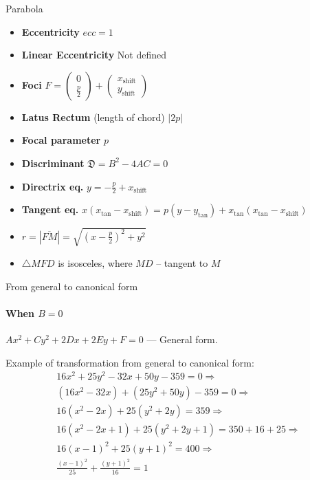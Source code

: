 \documentclass[aspectratio=169]{beamer}
\newcommand{\shf}{\text{shift}}
\begin{document}
\begin{frame}[t]{Parabola}
\begin{multicols}{3}
\begin{itemize}
        \item \textbf{Eccentricity} $ecc = 1$
        \item \textbf{Linear Eccentricity} Not defined
        \item \textbf{Foci} $F = \begin{pmatrix} 0\\\frac{p}{2} \end{pmatrix} + \begin{pmatrix} x_{\shf}\\y_{\shf} \end{pmatrix}$
        \item \textbf{Latus Rectum} (length of chord) $|2p|$
        \item \textbf{Focal parameter}  $p$
        \item \textbf{Discriminant} $\mathfrak{D} = B^2 - 4AC = 0$
        \item \textbf{Directrix eq.} $y = -\frac{p}{2} + x_{\shf}$
        \item \textbf{Tangent eq.}  $x(x_{\text{tan}}-x_{\shf})=p(y-y_{\text{tan}})+x_{\text{tan}}(x_{\text{tan}}-x_{\shf})$
        \item $r = |\overline{FM}|=\sqrt{(x-\frac{p}{2})^2+y^2}$
        \item $\triangle MFD$ is isosceles, where $MD$ -- tangent to $M$
        \end{itemize}
\end{multicols}
\end{frame}

\begin{frame}[t]{From general to canonical form}
\framesubtitle{When $B=0$}
    $Ax^2 +Cy^2 +2Dx + 2Ey +F = 0$ --- General form. \medskip

    Example of transformation from general to canonical form:
    \begin{align*}
        16x^2 + 25y^2 - 32x + 50y -359 = 0 \Rightarrow \\
        (16x^2 - 32x) + (25y^2 +50y) -359 = 0 \Rightarrow \\ 
        16(x^2 - 2x) + 25(y^2 + 2y) = 359 \Rightarrow \\ 
        16(x^2 -2x +1) + 25(y^2 +2y +1) = 350 + 16 + 25 \Rightarrow \\
        16(x-1)^2 +25(y+1)^2 = 400 \Rightarrow \\ 
        \frac{(x-1)^2}{25}+\frac{(y+1)^2}{16}=1
    \end{align*}
\end{frame}
\end{document}
